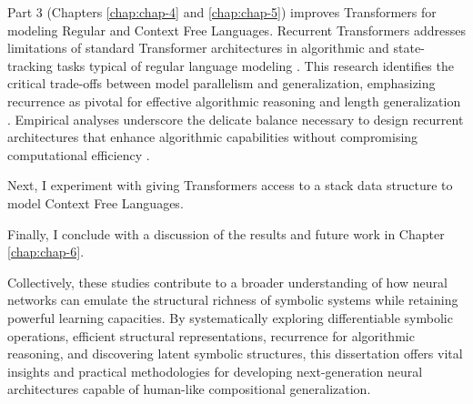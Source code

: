 Part 3 (Chapters \ref{chap:chap-4} and \ref{chap:chap-5}) improves Transformers for modeling Regular and Context Free Languages. Recurrent Transformers addresses limitations of standard Transformer architectures in algorithmic and state-tracking tasks typical of regular language modeling \citep{deletang, merrill2024the}. This research identifies the critical trade-offs between model parallelism and generalization, emphasizing recurrence as pivotal for effective algorithmic reasoning and length generalization \citep{soulos2024recurrent}. Empirical analyses underscore the delicate balance necessary to design recurrent architectures that enhance algorithmic capabilities without compromising computational efficiency \cite{ju_staircase_2022, hutchins_block-recurrent_2022}.



Next, I experiment with giving Transformers access to a stack data structure to model Context Free Languages.

Finally, I conclude with a discussion of the results and future work in Chapter \ref{chap:chap-6}. 

Collectively, these studies contribute to a broader understanding of how neural networks can emulate the structural richness of symbolic systems while retaining powerful learning capacities. By systematically exploring differentiable symbolic operations, efficient structural representations, recurrence for algorithmic reasoning, and discovering latent symbolic structures, this dissertation offers vital insights and practical methodologies for developing next-generation neural architectures capable of human-like compositional generalization.